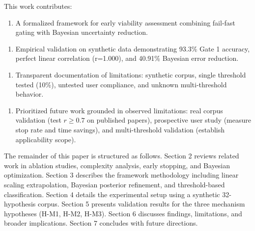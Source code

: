 This work contributes:

\begin{enumerate}
\item A formalized framework for early viability assessment combining fail-fast gating with Bayesian uncertainty reduction.
\end{enumerate}

\begin{enumerate}
\item Empirical validation on synthetic data demonstrating 93.3\% Gate 1 accuracy, perfect linear correlation (r=1.000), and 40.91\% Bayesian error reduction.
\end{enumerate}

\begin{enumerate}
\item Transparent documentation of limitations: synthetic corpus, single threshold tested (10\%), untested user compliance, and unknown multi-threshold behavior.
\end{enumerate}

\begin{enumerate}
\item Prioritized future work grounded in observed limitations: real corpus validation (test $r\geq 0.7$ on published papers), prospective user study (measure stop rate and time savings), and multi-threshold validation (establish applicability scope).
\end{enumerate}

The remainder of this paper is structured as follows. Section 2 reviews related work in ablation studies, complexity analysis, early stopping, and Bayesian optimization. Section 3 describes the framework methodology including linear scaling extrapolation, Bayesian posterior refinement, and threshold-based classification. Section 4 details the experimental setup using a synthetic 32-hypothesis corpus. Section 5 presents validation results for the three mechanism hypotheses (H-M1, H-M2, H-M3). Section 6 discusses findings, limitations, and broader implications. Section 7 concludes with future directions.
